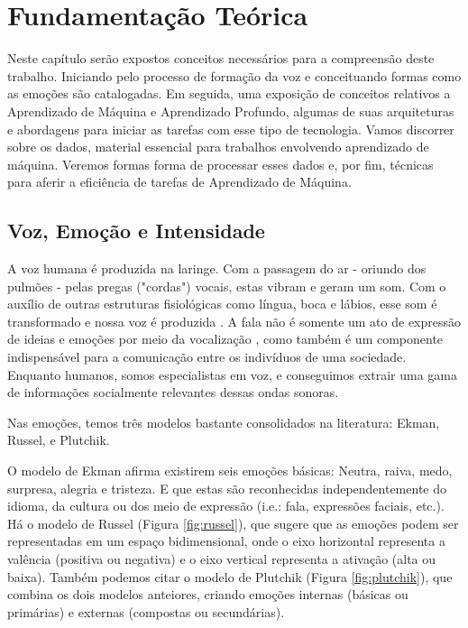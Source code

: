 \chapter{Fundamentação Teórica}\label{Cap:Fundamentação Teórica}

Neste capítulo serão expostos conceitos necessários para a compreensão deste trabalho. Iniciando pelo processo de formação da voz e conceituando formas como as emoções são catalogadas. Em seguida, uma exposição de conceitos relativos a Aprendizado de Máquina e Aprendizado Profundo, algumas de suas arquiteturas e abordagens para iniciar as tarefas com esse tipo de tecnologia. Vamos discorrer sobre os dados, material essencial para trabalhos envolvendo aprendizado de máquina. Veremos formas forma de processar esses dados e, por fim, técnicas para aferir a eficiência de tarefas de Aprendizado de Máquina.\\

\section{Voz, Emoção e Intensidade}

A voz humana é produzida na laringe. Com a passagem do ar - oriundo dos pulmões - pelas pregas ("cordas") vocais, estas vibram e geram um som. Com o auxílio de outras estruturas fisiológicas como língua, boca e lábios, esse som é transformado e nossa voz é produzida \cite{51}. A fala não é somente um ato de expressão de ideias e emoções por meio da vocalização \cite{6.31}, como também é um componente indispensável para a comunicação entre os indivíduos de uma sociedade. Enquanto humanos, somos especialistas em voz, e conseguimos extrair uma gama de informações socialmente relevantes \cite{49} dessas ondas sonoras.

Nas emoções, temos três modelos bastante consolidados na literatura: Ekman, Russel, e Plutchik.

O modelo de Ekman \cite{31.9} afirma existirem seis emoções básicas: Neutra, raiva, medo, surpresa, alegria e tristeza. E que estas são reconhecidas independentemente do idioma, da cultura ou dos meio de expressão (i.e.: fala, expressões faciais, etc.). Há o modelo de Russel \cite{31.10} (Figura \ref{fig:russel}), que sugere que as emoções podem ser representadas em um espaço bidimensional, onde o eixo horizontal representa a valência (positiva ou negativa) e o eixo vertical representa a ativação (alta ou baixa). Também podemos citar o modelo de Plutchik \cite{57} (Figura \ref{fig:plutchik}), que combina os dois modelos anteiores, criando emoções internas (básicas ou primárias) e externas (compostas ou secundárias).

